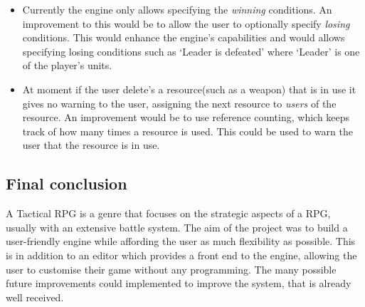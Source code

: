 \begin{itemize}
\item Currently the engine only allows specifying the \emph{winning} conditions. An improvement to this would be to allow the user to optionally specify \emph{losing} conditions. This would enhance the engine's capabilities and would allows specifying losing conditions such as `Leader is defeated' where `Leader' is one of the player's units.

\item At moment if the user delete's a resource(such as a weapon) that is in use it gives no warning to the user, assigning the next resource to \emph{users} of the resource. An improvement would be to use reference counting\cite{gc}, which keeps track of how many times a resource is used.  This could be used to warn the user that the resource is in use.

\end{itemize}

\subsection{Final conclusion}
A Tactical RPG is a genre that focuses on the strategic aspects of a RPG, usually with an extensive battle system.  The aim of the project was to build a user-friendly engine while affording the user as much flexibility as possible. This is in addition to an editor which provides a front end to the engine, allowing the user to customise their game without any programming.  The many possible future improvements could implemented to improve the system, that is already well received. 
